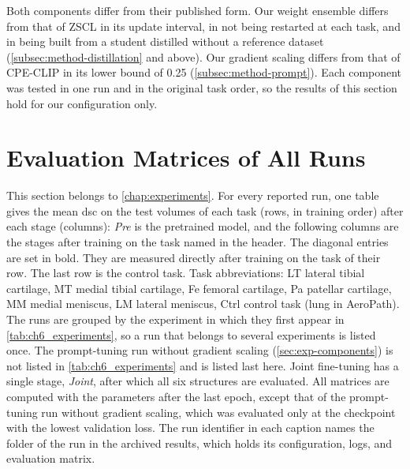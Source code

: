 Both components differ from their published form.
Our weight ensemble differs from that of ZSCL in its update interval, in not being restarted at each task, and in being built from a student distilled without a reference dataset (\cref{subsec:method-distillation} and above).
Our gradient scaling differs from that of CPE-CLIP in its lower bound of 0.25 (\cref{subsec:method-prompt}).
Each component was tested in one run and in the original task order, so the results of this section hold for our configuration only.

\FloatBarrier
\section{Evaluation Matrices of All Runs}
\label{sec:app-matrices}

This section belongs to \cref{chap:experiments}.
For every reported run, one table gives the mean \gls{dsc} on the test volumes of each task (rows, in training order) after each stage (columns): \emph{Pre} is the pretrained model, and the following columns are the stages after training on the task named in the header.
The diagonal entries are set in bold.
They are measured directly after training on the task of their row.
The last row is the control task.
Task abbreviations: LT lateral tibial cartilage, MT medial tibial cartilage, Fe femoral cartilage, Pa patellar cartilage, MM medial meniscus, LM lateral meniscus, Ctrl control task (lung in AeroPath).
The runs are grouped by the experiment in which they first appear in \cref{tab:ch6_experiments}, so a run that belongs to several experiments is listed once.
The prompt-tuning run without gradient scaling (\cref{sec:exp-components}) is not listed in \cref{tab:ch6_experiments} and is listed last here.
Joint fine-tuning has a single stage, \emph{Joint}, after which all six structures are evaluated.
All matrices are computed with the parameters after the last epoch, except that of the prompt-tuning run without gradient scaling, which was evaluated only at the checkpoint with the lowest validation loss.
The run identifier in each caption names the folder of the run in the archived results, which holds its configuration, logs, and evaluation matrix.

\raggedbottom


